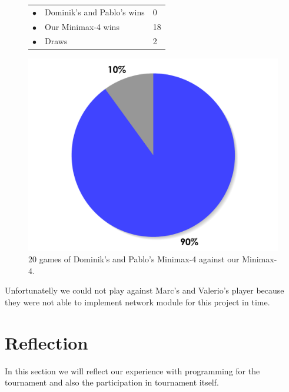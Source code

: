 \documentclass[paper=a4, fontsize=11pt]{article} %
\newcommand{\ra}[1]{\renewcommand{\arraystretch}{#1}}
\begin{document}
\begin{figure}[ht]
    \begin{minipage}[c]{0.40\linewidth}
        \centering
        \ra{1.3}
        \begin{tabular}{cll}
            \toprule
            \textcolor{red!100}{$\bullet$} & Dominik's and Pablo's wins & 0       \\
            \textcolor{blue!100!yellow!100!red!80}{$\bullet$} & Our Minimax-4  wins & 18      \\  
            \textcolor{gray!100}{$\bullet$} & Draws & 2      \\  
            \bottomrule
        \end{tabular}
    \end{minipage}
    \begin{minipage}[c]{0.60\linewidth}
        \centering
        \includegraphics[scale=0.35]{img/tournament.pdf}
    \end{minipage}
    \caption{20 games of Dominik's and Pablo's Minimax-4 against our Minimax-4.}
    \label{fig:tournament}
\end{figure}

Unfortunatelly we could not play against Marc's and Valerio's player because they were not able to implement network module for this project in time.

\section{Reflection}
In this section we will reflect our experience with programming for the tournament and also the participation in tournament itself.
\end{document}
